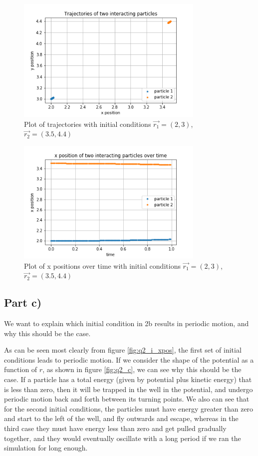 \documentclass{article}
\begin{document}
\begin{figure}[H]
	\centering
	\includegraphics[width=0.8\textwidth]{../images/q2_iii_traj.png}
	\caption{Plot of trajectories with initial conditions $\vec{r_1}=(2,3)$, $\vec{r_2}=(3.5,4.4)$}
	\label{fig:q2_iii_traj}
\end{figure}

\begin{figure}[H]
	\centering
	\includegraphics[width=0.8\textwidth]{../images/q2_iii_xpos.png}
	\caption{Plot of x positions over time with initial conditions $\vec{r_1}=(2,3)$, $\vec{r_2}=(3.5,4.4)$}
	\label{fig:q2_iii_xpos}
\end{figure}

\subsection{Part c)}

We want to explain which initial condition in 2b results in periodic motion, and why this should be the case.

As can be seen most clearly from figure \ref{fig:q2_i_xpos}, the first set of initial conditions leads to periodic motion. If we consider the shape of the potential as a function of $r$, as shown in figure \ref{fig:q2_c}, we can see why this should be the case. If a particle has a total energy (given by potential plus kinetic energy) that is less than zero, then it will be trapped in the well in the potential, and undergo periodic motion back and forth between its turning points. We also can see that for the second initial conditions, the particles must have energy greater than zero and start to the left of the well, and fly outwards and escape, whereas in the third case they must have energy less than zero and get pulled gradually together, and they would eventually oscillate with a long period if we ran the simulation for long enough.
\end{document}
